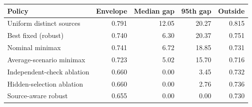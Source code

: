 \begin{tabular}{@{}lrrrr@{}}
\toprule
Policy & Envelope & Median gap & 95th gap & Outside \\
\midrule
Uniform distinct sources & 0.791 & 12.05 & 20.27 & 0.815 \\
Best fixed (robust) & 0.740 & 6.30 & 20.37 & 0.751 \\
Nominal minimax & 0.741 & 6.72 & 18.85 & 0.731 \\
Average-scenario minimax & 0.723 & 5.02 & 15.70 & 0.716 \\
Independent-check ablation & 0.660 & 0.00 & 3.45 & 0.732 \\
Hidden-selection ablation & 0.660 & 0.00 & 2.76 & 0.736 \\
Source-aware robust & 0.655 & 0.00 & 0.00 & 0.730 \\
\bottomrule
\end{tabular}
